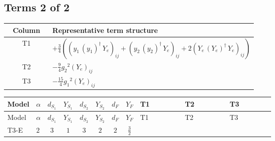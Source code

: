 \documentclass[8pt]{article}
\begin{document}
\begin{landscape}
\subsection*{Terms 2 of 2}
\begin{center}
\begin{tabular}{@{}c >{\raggedright\arraybackslash}p{0.82\linewidth}@{}}
\toprule
Column & Representative term structure \\
\midrule
T1 & \(\displaystyle +\frac{3}{4} (\left({y_1}\,\left({y_1}\right)^{\dagger}\,{Y_e}\right)_{ij}+\left({y_2}\,\left({y_2}\right)^{\dagger}\,{Y_e}\right)_{ij}+2 \left({Y_e}\,\left({Y_e}\right)^{\dagger}\,{Y_e}\right)_{ij})\) \\
\midrule
T2 & \(\displaystyle -\frac{9}{4} {g_2}^2 \left({Y_e}\right)_{ij}\) \\
\midrule
T3 & \(\displaystyle -\frac{15}{4} {g_1}^2 \left({Y_e}\right)_{ij}\) \\
\midrule
\bottomrule
\end{tabular}
\end{center}
\smallskip
\tiny
\begin{longtable}{@{}llcccccc >{\raggedright\arraybackslash}p{0.21\linewidth} >{\raggedright\arraybackslash}p{0.21\linewidth} >{\raggedright\arraybackslash}p{0.21\linewidth}@{}}
\toprule
Model & $\alpha$ & $d_{S_1}$ & $Y_{S_1}$ & $d_{S_2}$ & $Y_{S_2}$ & $d_F$ & $Y_F$ & T1 & T2 & T3 \\
\midrule
\endfirsthead
\toprule
Model & $\alpha$ & $d_{S_1}$ & $Y_{S_1}$ & $d_{S_2}$ & $Y_{S_2}$ & $d_F$ & $Y_F$ & T1 & T2 & T3 \\
\midrule
\endhead
T3-E & $2$ & $3$ & $1$ & $3$ & $2$ & $2$ & $\frac{3}{2}$ & \scriptsize\adjustbox{max width=\linewidth}{$\begin{gathered} +\frac{3}{4} (\left({y_1}\,\left({y_1}\right)^{\dagger}\,{Y_e}\right)_{ij}+\left({y_2}\,\left({y_2}\right)^{\dagger}\,{Y_e}\right)_{ij}+2 \left({Y_e}\,\left({Y_e}\right)^{\dagger}\,{Y_e}\right)_{ij})\end{gathered}$} & \scriptsize\adjustbox{max width=\linewidth}{$\begin{gathered} -\frac{9}{4} {g_2}^2 \left({Y_e}\right)_{ij}\end{gathered}$} & \scriptsize\adjustbox{max width=\linewidth}{$\begin{gathered} -\frac{15}{4} {g_1}^2 \left({Y_e}\right)_{ij}\end{gathered}$} \\
\midrule
\bottomrule
\end{longtable}
\clearpage

\end{landscape}
\end{document}

